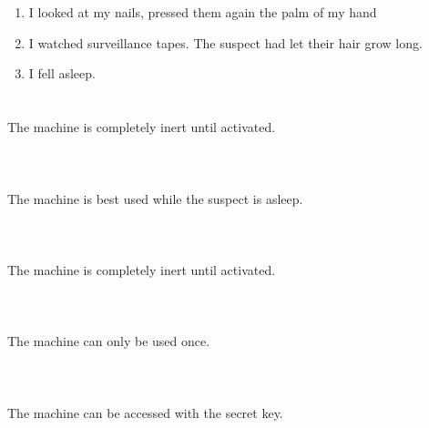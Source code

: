 \documentclass{article}
\begin{document}
    \newpage
    
    \section{}
    
    \begin{enumerate}
    
    \item I looked at my nails, pressed them again the palm of my hand\\
    
    \item I watched surveillance tapes. The suspect had let their hair grow long.\\
    
    \item I fell asleep.\\
    
    \end{enumerate}
     
    \newpage
    
    \section{}
    The machine is completely inert until activated.\\\\ 
    \newpage
    
    \section{}
    The machine is best used while the suspect is asleep.\\\\ 
    \newpage
    
    \section{}
    The machine is completely inert until activated.\\\\ 
    \newpage
    
    \section{}
    The machine can only be used once.\\\\ 
    \newpage
    
    \section{}
    The machine can be accessed with the secret key.\\\\ 
    \newpage
    
\end{document}
